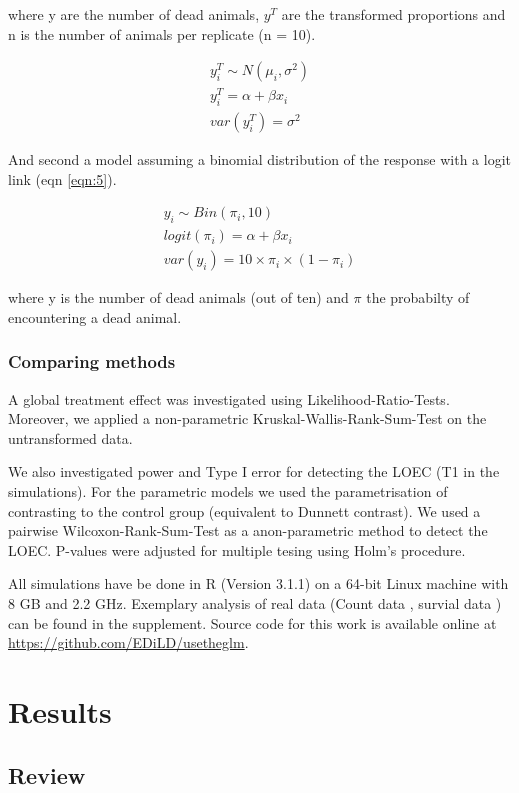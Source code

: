 \documentclass{scrartcl}\usepackage[]{graphicx}\usepackage[]{color}
\begin{document}
where y are the number of dead animals, $y^T$ are the transformed proportions and n is the number of animals per replicate (n = 10).

\begin{align}
  y^T_i \sim N(\mu_i, \sigma^2) \nonumber \\
  y^T_i = \alpha + \beta x_i \label{eqn:4} \\
  var(y^T_i) = \sigma^2 \nonumber
\end{align}

And second a model assuming a binomial distribution of the response with a logit link (eqn \ref{eqn:5}).

\begin{align}
  y_i \sim Bin(\pi_i, 10) \nonumber \\
  logit(\pi_i) = \alpha + \beta x_i \label{eqn:5} \\
  var(y_i) = 10 \times \pi_i \times (1 - \pi_i) \nonumber
\end{align}

where y is the number of dead animals (out of ten) and $\pi$ the probabilty of encountering a dead animal.

\subsubsection{Comparing methods}
A global treatment effect was investigated using Likelihood-Ratio-Tests.
Moreover, we applied a non-parametric Kruskal-Wallis-Rank-Sum-Test on the untransformed data.

We also investigated power and Type I error for detecting the LOEC (T1 in the simulations).
For the parametric models we used the parametrisation of contrasting to the control group (equivalent to Dunnett contrast).
We used a pairwise Wilcoxon-Rank-Sum-Test as a anon-parametric method to detect the LOEC.
P-values were adjusted for multiple tesing using Holm's procedure.

All simulations have be done in R (Version 3.1.1) on a 64-bit Linux machine with 8 GB and 2.2 GHz.
Exemplary analysis of real data (Count data \citep{brock_minimum_2014}, survial data \citep{epa_methods_2002}) can be found in the supplement.
Source code for this work is available online at \url{https://github.com/EDiLD/usetheglm}. 


\section{Results}
\subsection{Review}
\end{document}
